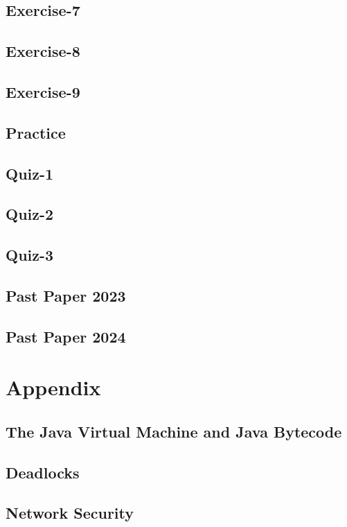 \documentclass[
  11pt,
  a4paper,
]{book}
\begin{document}
\section{Exercise-7}

\section{Exercise-8}

\section{Exercise-9}

\section{Practice}

\section{Quiz-1}

\section{Quiz-2}

\section{Quiz-3}

\section{Past Paper 2023}

\section{Past Paper 2024}

\pagebreak
\chapter{Appendix}
\section[The JVM and Java Bytecode]{The Java Virtual Machine and Java Bytecode}

\section{Deadlocks}

\section{Network Security}

\end{document}
